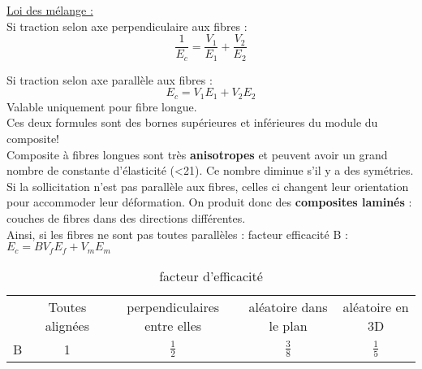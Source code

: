 \documentclass[../main.tex]{subfiles}
\begin{document}
\quad \underline{Loi des mélange :}\\
Si traction selon axe perpendiculaire aux fibres :\\
\begin{equation}
    \frac{1}{E_c} = \frac{V_1}{E_1} + \frac{V_2}{E_2}
\end{equation}

Si traction selon axe parallèle aux fibres :\\
\begin{equation}
    E_c = V_1 E_1+V_2E_2
\end{equation}
\warning Valable uniquement pour fibre longue.\\
Ces deux formules sont des bornes supérieures et inférieures du module du composite!\\

Composite à fibres longues sont très \textbf{anisotropes} et peuvent avoir un grand nombre de constante d'élasticité (<21). Ce nombre diminue s'il y a des symétries.\\
Si la sollicitation n'est pas parallèle aux fibres, celles ci changent leur orientation pour accommoder leur déformation. On produit donc des \textbf{composites laminés} : couches de fibres dans des directions différentes.\\

Ainsi, si les fibres ne sont pas toutes parallèles : facteur efficacité B : $E_c = B V_fE_f + V_mE_m$\\
\begin{table}[hbt!]
    \centering
    \begin{tabular}{||c|c|c|c|c|}
        \hline
         & Toutes alignées & perpendiculaires entre elles & aléatoire dans le plan & aléatoire en 3D \\
        B & 1 & $\frac{1}{2}$ & $\frac{3}{8}$ & $\frac{1}{5}$\\
        \hline
    \end{tabular}
    \caption{facteur d'efficacité}
\end{table}
\end{document}
